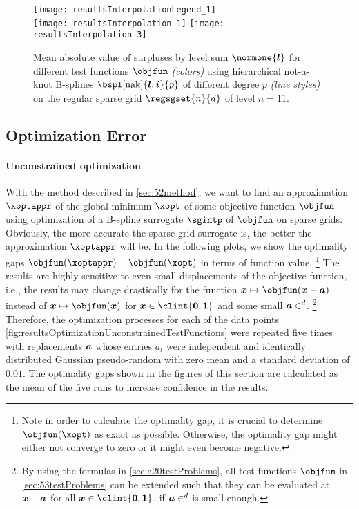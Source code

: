 \begin{figure}
  \texttt{[image: resultsInterpolationLegend\_1]}\\[2mm]%
  \texttt{[image: resultsInterpolation\_1]}%
  \hfill%
  \texttt{[image: resultsInterpolation\_3]}%
  \caption[Decay of surpluses for different test functions]{%
    Mean absolute value of surpluses by level sum $\normone{\*l}$
    for different test functions $\objfun$ \emph{(colors)}
    using hierarchical not-a-knot B-splines
    $\bspl[\nak]{\*l,\*i}{p}$ of different degree $p$ \emph{(line styles)} on
    the regular sparse grid $\regsgset{n}{d}$ of level $n = 11$.%
  }%
  \label{fig:resultsDecaySurpluses}%
\end{figure}



\subsection{Optimization Error}
\label{sec:542optimization}

\paragraph{Unconstrained optimization}

With the method described in \cref{sec:52method},
we want to find an approximation $\xoptappr$ of the
global minimum $\xopt$ of some objective function $\objfun$
using optimization of a B-spline surrogate $\sgintp$ of $\objfun$
on sparse grids.
Obviously, the more accurate the sparse grid surrogate is,
the better the approximation $\xoptappr$ will be.
In the following plots,
we show the optimality gaps $\objfun(\xoptappr) - \objfun(\xopt)$
in terms of function value.%
\footnote{%
  Note in order to calculate the optimality gap,
  it is crucial to determine $\objfun(\xopt)$ as exact as possible.
  Otherwise, the optimality gap might either not converge to zero
  or it might even become negative.%
}
The results are highly sensitive to even small displacements
of the objective function, i.e.,
the results may change drastically for the
function $\*x \mapsto \objfun(\*x - \*a)$
instead of $\*x \mapsto \objfun(\*x)$ for $\*x \in \clint{\*0, \*1}$
and some small $\*a \in \real^d$.%
\footnote{%
  By using the formulas in \cref{sec:a20testProblems},
  all test functions $\objfun$ in \cref{sec:53testProblems}
  can be extended such that they can be evaluated at ${\boldsymbol{x}} - {\boldsymbol{a}}$
  for all $\*x \in \clint{\*0, \*1}$, if $\*a \in \real^d$ is small enough.%
}
Therefore, the optimization processes for each of the
data points \cref{fig:resultsOptimizationUnconstrainedTestFunctions}
were repeated five times with replacements ${\boldsymbol{a}}$
whose entries $a_t$ were independent and identically distributed Gaussian
pseudo-random with zero mean and a standard deviation of $0.01$.
The optimality gaps shown in the figures of this section are calculated
as the mean of the five runs to increase confidence in the results.

